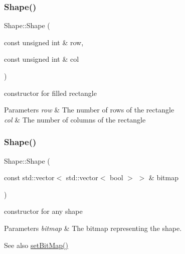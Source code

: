 \mbox{\label{class_shape_adb7c908a72cc99aee8c23ff0d4c6173a}} 
\subsubsection{\texorpdfstring{Shape()}{Shape()}\hspace{0.1cm}{\footnotesize\ttfamily [2/3]}}
{\footnotesize\ttfamily Shape\+::\+Shape (\begin{DoxyParamCaption}\item[{const unsigned int \&}]{row,  }\item[{const unsigned int \&}]{col }\end{DoxyParamCaption})}



constructor for filled rectangle 


\begin{DoxyParams}{Parameters}
{\em row} & The number of rows of the rectangle \\
\hline
{\em col} & The number of columns of the rectangle \\
\hline
\end{DoxyParams}
\mbox{\label{class_shape_a9004eb6a22e2f005aed9aac83aa7377b}} 
\subsubsection{\texorpdfstring{Shape()}{Shape()}\hspace{0.1cm}{\footnotesize\ttfamily [3/3]}}
{\footnotesize\ttfamily Shape\+::\+Shape (\begin{DoxyParamCaption}\item[{const std\+::vector$<$ std\+::vector$<$ bool $>$ $>$ \&}]{bitmap }\end{DoxyParamCaption})}



constructor for any shape 


\begin{DoxyParams}{Parameters}
{\em bitmap} & The bitmap representing the shape. \\
\hline
\end{DoxyParams}
\begin{DoxySeeAlso}{See also}
\mbox{\hyperlink{class_shape_ae79ee483d0f48a426d1a544fd22fd8e5}{set\+Bit\+Map()}} 
\end{DoxySeeAlso}


